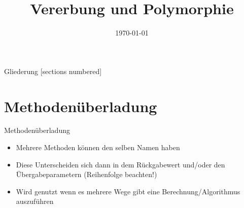 



\title{Vererbung und Polymorphie}
\date{\today}




\maketitle

\begin{frame}{Gliederung}
	[sections numbered]
	\tableofcontents
\end{frame}

\section{Methodenüberladung}
\begin{frame}{Methodenüberladung}
	\begin{itemize}
		\item Mehrere Methoden können den selben Namen haben
		\item Diese Unterscheiden sich dann in dem Rückgabewert und/oder den Übergabeparametern (Reihenfolge beachten!) 
		\item Wird genutzt wenn es mehrere Wege gibt eine Berechnung/Algorithmus auszuführen
	\end{itemize}
	
\end{frame}

